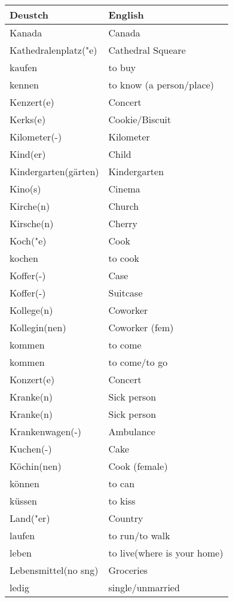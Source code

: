 \documentclass{article}
\renewcommand{\arraystretch}{1}
\begin{document}
\hfill
\begin{minipage}{0.48\textwidth}
    \centering
    \renewcommand{\arraystretch}{1.5}
    \begin{tabular}{|>{\raggedright\arraybackslash}p{3.5cm}|>{\raggedright\arraybackslash}p{3.5cm}|}
        \hline
        \rowcolor{gray!20} \textbf{Deustch} & \textbf{English} \\
        \hline
        Kanada & Canada \\\hline
        Kathedralenplatz("e) & Cathedral Squeare \\\hline
        kaufen & to buy \\\hline
        kennen & to know (a person/place) \\\hline
        Kenzert(e) & Concert \\\hline
        Kerks(e) & Cookie/Biscuit \\\hline
        Kilometer(-) & Kilometer \\\hline
        Kind(er) & Child \\\hline
        Kindergarten(gärten) & Kindergarten \\\hline
        Kino(s) & Cinema \\\hline
        Kirche(n) & Church \\\hline
        Kirsche(n) & Cherry \\\hline
        Koch("e) & Cook \\\hline
        kochen & to cook \\\hline
        Koffer(-) & Case \\\hline
        Koffer(-) & Suitcase \\\hline
        Kollege(n) & Coworker \\\hline
        Kollegin(nen) & Coworker (fem) \\\hline
        kommen & to come \\\hline
        kommen & to come/to go \\\hline
        Konzert(e) & Concert \\\hline
        Kranke(n) & Sick person \\\hline
        Kranke(n) & Sick person \\\hline
        Krankenwagen(-) & Ambulance \\\hline
        Kuchen(-) & Cake \\\hline
        Köchin(nen) & Cook (female) \\\hline
        können & to can \\\hline
        küssen & to kiss \\\hline
        Land("er) & Country \\\hline
        laufen & to run/to walk \\\hline
        leben & to live(where is your home) \\\hline
        Lebensmittel(no sng) & Groceries \\\hline
        ledig & single/unmarried \\\hline
    \end{tabular}
\end{minipage}
\end{document}
